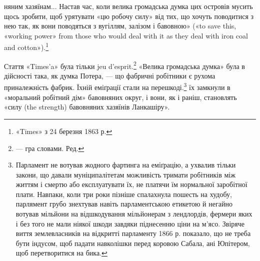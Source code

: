няним хазяїнам... Настав час, коли велика громадська думка
цих островів мусить щось зробити, щоб урятувати «цю робочу
силу» від тих, що хочуть поводитися з нею так, як вони поводяться
з вугіллям, залізом і бавовною» («to save this, «working
power» from those who would deal with it as they deal with iron
coal and cotton»).\footnote{
«Times» з 24 березня 1863 р.
}

Стаття «Times’a» була тільки jeu d’esprit.\footnote*{
— гра словами. Ред.
} «Велика громадська
думка» була в дійсності така, як думка Потера, — що фабричні
робітники є рухома приналежність фабрик. Їхній еміґрації
стали на перешкоді.\footnote{
Парламент не вотував жодного фартинга на еміґрацію, а ухвалив
тільки закони, що давали муніципалітетам можливість тримати робітників
між життям і смертю або експлуатувати їх, не платячи їм нормальної
заробітної плати. Навпаки, коли три роки пізніше спалахнула пошесть
на худобу, парлямент грубо знехтував навіть парламентською етикетою й
негайно вотував мільйони на відшкодування мільйонерам з лендлордів,
фермери яких і без того не мали ніякої шкоди завдяки піднесенню ціни
на м’ясо. Звіряче виття землевласників на відкритті парламенту 1866 р.
показало, що не треба бути індусом, щоб падати навколішки перед коровою
Сабала, ані Юпітером, щоб перетворитися на бика.
} їх замкнули в «моральний робітний
дім» бавовняних округ, і вони, як і раніш, становлять «силу
(the strength) бавовняних хазяїнів Ланкашіру».

